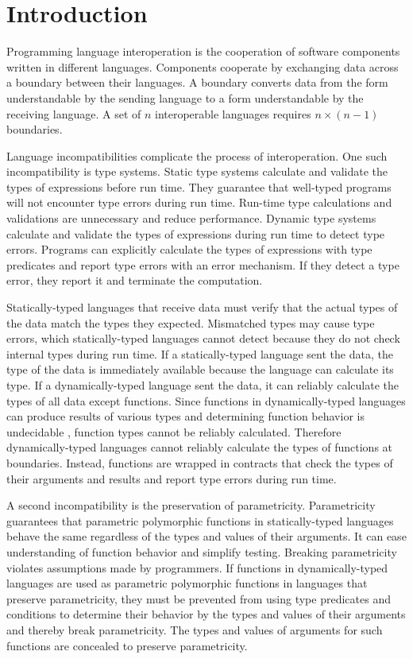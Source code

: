 \chapter{Introduction}

Programming language interoperation is the cooperation of software components written in different languages.  Components cooperate by exchanging data across a boundary between their languages.  A boundary converts data from the form understandable by the sending language to a form understandable by the receiving language.  A set of $n$ interoperable languages requires $n\times(n-1)$ boundaries.

Language incompatibilities complicate the process of interoperation.  One such incompatibility is type systems.  Static type systems calculate and validate the types of expressions before run time.  They guarantee that well-typed programs will not encounter type errors during run time.  Run-time type calculations and validations are unnecessary and reduce performance.  Dynamic type systems calculate and validate the types of expressions during run time to detect type errors.  Programs can explicitly calculate the types of expressions with type predicates and report type errors with an error mechanism.  If they detect a type error, they report it and terminate the computation.

Statically-typed languages that receive data must verify that the actual types of the data match the types they expected.  Mismatched types may cause type errors, which statically-typed languages cannot detect because they do not check internal types during run time.  If a statically-typed language sent the data, the type of the data is immediately available because the language can calculate its type.  If a dynamically-typed language sent the data, it can reliably calculate the types of all data except functions.  Since functions in dynamically-typed languages can produce results of various types and determining function behavior is undecidable \cite{blume04}, function types cannot be reliably calculated.  Therefore dynamically-typed languages cannot reliably calculate the types of functions at boundaries.  Instead, functions are wrapped in contracts \cite{findler02} that check the types of their arguments and results and report type errors during run time.

A second incompatibility is the preservation of parametricity.  Parametricity guarantees that parametric polymorphic functions in statically-typed languages behave the same regardless of the types and values of their arguments.  It can ease understanding of function behavior and simplify testing.  Breaking parametricity violates assumptions made by programmers.  If functions in dynamically-typed languages are used as parametric polymorphic functions in languages that preserve parametricity, they must be prevented from using type predicates and conditions to determine their behavior by the types and values of their arguments and thereby break parametricity.  The types and values of arguments for such functions are concealed to preserve parametricity.

